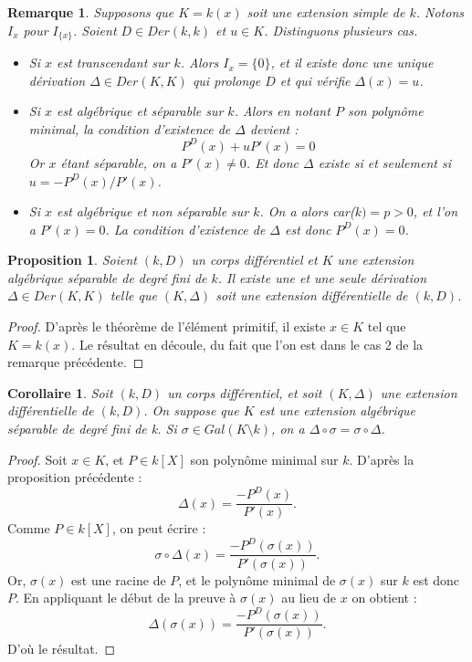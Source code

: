 \documentclass[12pt,a4paper]{report}
\newtheorem{prop}[thm]{\bf Proposition}
\newtheorem{cor}[thm]{\bf Corollaire}
\newtheorem{rem}[thm]{Remarque}
\begin{document}
\begin{rem}\rm
Supposons que $K=k(x)$ soit une extension simple de $k$. Notons $I_x$ pour $I_{\{x\}}$. Soient $D\in Der(k,k)$ et $u\in K$. Distinguons plusieurs cas. 

\begin{itemize}
\item[1)] Si $x$ est transcendant sur $k$. Alors $I_x=\{0\}$, et il existe donc une unique dérivation $\Delta \in Der(K,K)$ qui prolonge $D$ et qui vérifie $\Delta(x)=u$. 
\item[2)] Si $x$ est algébrique et séparable sur $k$. Alors en notant $P$ son polynôme minimal, la condition d'existence de $\Delta$ devient :
$$P^D(x)+uP'(x)=0$$
Or $x$ étant séparable, on a $P'(x)\neq 0$. Et donc $\Delta$ existe si et seulement si $u=-P^D(x)/P'(x)$. 
\item[3)]Si $x$ est algébrique et non séparable sur $k$. On a alors car($k)=p>0$, et l'on a $P'(x)=0$. La condition d'existence de $\Delta$ est donc $P^D(x)=0$. 
\end{itemize}

\end{rem}

\begin{prop}\rm
Soient $(k,D)$ un corps différentiel et $K$ une extension algébrique séparable de degré fini de $k$. Il existe une et une seule dérivation $\Delta \in Der(K,K)$ telle que $(K,\Delta)$ soit une extension différentielle de $(k,D)$.

\end{prop}

\begin{proof}
D'après le théorème de l'élément primitif, il existe $x\in K$ tel que $K=k(x)$. Le résultat en découle, du fait que l'on est dans le cas 2 de la remarque précédente. 
\end{proof}

\begin{cor}\rm
Soit $(k,D)$ un corps différentiel, et soit $(K,\Delta)$ une extension différentielle de $(k,D)$. On suppose que $K$ est une extension algébrique séparable de degré fini de k. Si $\sigma \in Gal(K\setminus k)$, on a $\Delta \circ \sigma =\sigma \circ \Delta$. 
\end{cor}

\begin{proof}
Soit $x \in K$, et $P \in k[X]$ son polynôme minimal sur $k$. 
D'après la proposition précédente : 
$$\Delta(x)=\dfrac{-P^{D}(x)}{P'(x)}.$$
Comme $P \in k[X]$, on peut écrire : 
$$\sigma \circ \Delta(x)=\dfrac{-P^{D}(\sigma(x))}{P'(\sigma(x))}.$$
Or, $\sigma(x)$ est une racine de $P$, et le polynôme minimal de $\sigma(x)$ sur $k$ est donc $P$. En appliquant le début de la preuve à $\sigma(x)$ au lieu de $x$ on obtient : 
$$ \Delta(\sigma(x))=\dfrac{-P^{D}(\sigma(x))}{P'(\sigma(x))}.$$
D'où le résultat. 
\end{proof}
\end{document}
